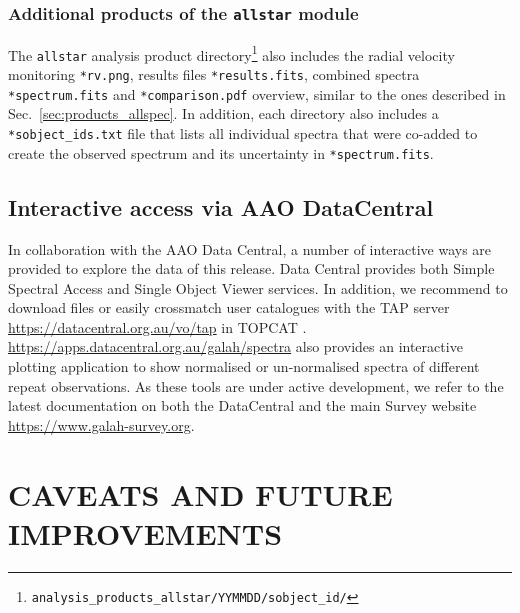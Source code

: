 \documentclass[
  journal=pasa,
  manuscript=research-paper, %
  year=2024,
  volume=37
]{cup-journal}
\begin{document}
\subsubsection{Additional products of the \texttt{allstar} module} \label{sec:products_allstar}

The \texttt{allstar} analysis product directory\footnote{\texttt{analysis\_products\_allstar/YYMMDD/sobject\_id/}} also includes the radial velocity monitoring \texttt{*rv.png}, results files  \texttt{*results.fits}, combined spectra \texttt{*spectrum.fits} and \texttt{*comparison.pdf} overview, similar to the ones described in Sec.~\ref{sec:products_allspec}. In addition, each directory also includes a \texttt{*sobject\_ids.txt} file that lists all individual spectra that were co-added to create the observed spectrum and its uncertainty in \texttt{*spectrum.fits}.


\subsection{Interactive access via AAO DataCentral}
\label{sec:interactive}

In collaboration with the AAO Data Central, a number of interactive ways are provided to explore the data of this release. Data Central provides both Simple Spectral Access and Single Object Viewer services. In addition, we recommend to download files or easily crossmatch user catalogues with the TAP server \url{https://datacentral.org.au/vo/tap} in \textsc{TOPCAT} \citep{Taylor2005}. \url{https://apps.datacentral.org.au/galah/spectra} also provides an interactive plotting application to show normalised or un-normalised spectra of different repeat observations. As these tools are under active development, we refer to the latest documentation on both the DataCentral and the main Survey website \url{https://www.galah-survey.org}.

\section{CAVEATS AND FUTURE IMPROVEMENTS} \label{sec:caveats}
\end{document}
